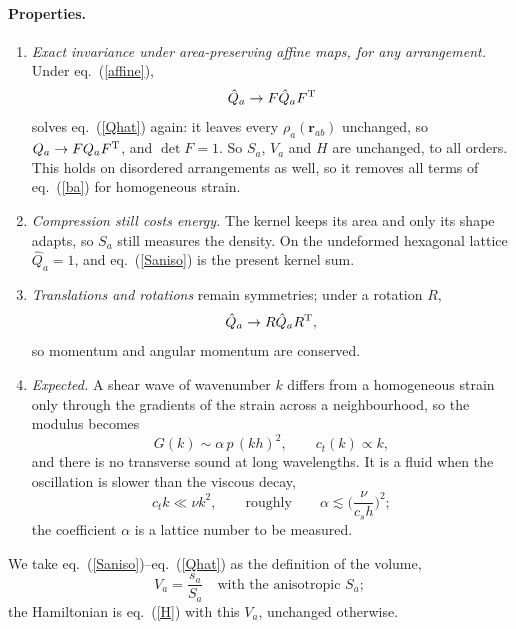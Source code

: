\documentclass[11pt,aps,preprint,nofootinbib,superscriptaddress,tightenlines]{revtex4-2}
\def\st{\begin{equation}}
\def\stp{\end{equation}}
\def\Eq#1{eq.~(\ref{#1})}
\let\oldparagraph\paragraph
\renewcommand{\paragraph}{\par\bigskip\oldparagraph}
\begin{document}
\paragraph{Properties.}
\begin{enumerate}
\item \emph{Exact invariance under area-preserving affine maps, for any arrangement.}  Under
  \Eq{affine},
  \st
  \hat Q_a\to F\hat Q_aF^{\rm T}
  \stp
  solves \Eq{Qhat} again: it leaves every $\rho_a(\bm r_{ab})$ unchanged, so
  $Q_a\to FQ_aF^{\rm T}$, and $\det F=1$.  So $S_a$, $V_a$ and $H$ are unchanged, to all
  orders.  This holds on disordered arrangements as well, so it removes all terms of
  \Eq{ba} for homogeneous strain.
\item \emph{Compression still costs energy.}  The kernel keeps its area and only its shape
  adapts, so $S_a$ still measures the density.  On the undeformed hexagonal lattice
  $\hat Q_a=1$, and \Eq{Saniso} is the present kernel sum.
\item \emph{Translations and rotations} remain symmetries; under a rotation $R$,
  \st
  \hat Q_a\to R\hat Q_aR^{\rm T},
  \stp
  so momentum and angular momentum are conserved.
\item \emph{Expected.}  A shear wave of wavenumber $k$ differs from a homogeneous strain only
  through the gradients of the strain across a neighbourhood, so the modulus becomes
  \st
  G(k)\sim\alpha\,p\,(kh)^2,\qquad c_t(k)\propto k ,
  \stp
  and there is no transverse sound at long wavelengths.  It is a fluid when the oscillation
  is slower than the viscous decay,
  \st
  c_t k\ll\nu k^2,\qquad\text{roughly}\qquad \alpha\lesssim\Big(\frac{\nu}{c_sh}\Big)^2 ;
  \stp
  the coefficient $\alpha$ is a lattice number to be measured.
\end{enumerate}
We take \Eq{Saniso}--\Eq{Qhat} as the definition of the volume,
\st
V_a=\frac{s_a}{S_a}\quad\text{with the anisotropic }S_a ;
\stp
the Hamiltonian is \Eq{H} with this $V_a$, unchanged otherwise.
\end{document}
